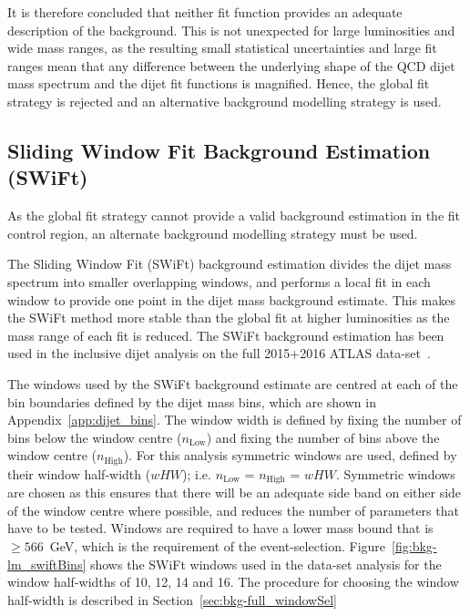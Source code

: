 \newpage
It is therefore concluded that neither fit function provides an adequate description of the background.
This is not unexpected for large luminosities and wide mass ranges,
as the resulting small statistical uncertainties and large fit ranges mean that any
difference between the underlying shape of the QCD dijet mass spectrum
and the dijet fit functions is magnified.
Hence, the global fit strategy is rejected and an alternative background modelling strategy is used.



\newpage
\subsection{Sliding Window Fit Background Estimation (SWiFt)}\label{sec:bkg-full_swift}

As the global fit strategy cannot provide a valid background estimation in the
\lm{} fit control region, an alternate background modelling strategy must be used.

The Sliding Window Fit (SWiFt) background estimation divides the dijet mass spectrum into smaller overlapping windows,
and performs a local fit in each window to provide one point in the dijet mass background estimate.
This makes the SWiFt method more stable than the global fit at higher luminosities as the mass range of each fit is reduced.
The SWiFt background estimation has been used in the inclusive dijet analysis on the full 2015+2016 ATLAS data-set~\cite{dijet-mori17_paper}.

The windows used by the SWiFt background estimate are centred at each of the
bin boundaries defined by the dijet mass bins, which are shown in Appendix~\ref{app:dijet_bins}.
The window width is defined by fixing the number of bins below the window centre ($n_{\text{Low}}$)
and fixing the number of bins above the window centre ($n_{\text{High}}$).
For this analysis symmetric windows are used, defined by their window half-width ($wHW$); i.e. $n_{\text{Low}}$ = $n_{\text{High}}$ = $wHW$.
Symmetric windows are chosen as this ensures that there will be an adequate side band on either side of the window centre where possible,
and reduces the number of parameters that have to be tested.
Windows are required to have a lower mass bound that is $\geq566$~GeV, which is the \mjj{} requirement of the event-selection.
Figure~\ref{fig:bkg-lm_swiftBins} shows the SWiFt windows used in the \lm{} data-set analysis for the window half-widths of 10, 12, 14 and 16.
The procedure for choosing the window half-width is described in Section~\ref{sec:bkg-full_windowSel}

